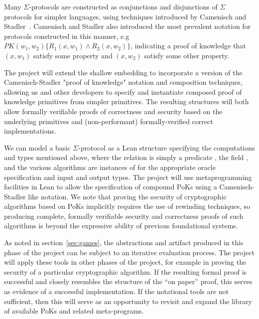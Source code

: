 Many $\Sigma$-protocols are constructed as conjunctions and disjunctions of $\Sigma$ protocols for simpler languages, using techniques introduced by Camenisch and Stadler~\cite{camenisch1997proof}.  
Camenisch and Stadler also introduced the most prevalent notation for protocols constructed in this manner, e.g $PK(w_1,w_2)\{ R_1(x,w_1) \land R_2(x,w_2)\}$, indicating a proof of knowledge that $(x,w_1)$ satisfy some property and $(x,w_2)$ satisfy some other property.

The project will extend the \vcvio shallow embedding to incorporate a version of the Camenisch-Stadler "proof of knowledge" notation and composition techniques, allowing us and other developers to specify and instantiate composed proof of knowledge primitives from simpler primitives.  The resulting structures will both allow formally verifiable proofs of correctness and security based on the underlying primitives and (non-performant) formally-verified correct implementations.  

We can model a basic $\Sigma$-protocol as a Lean structure specifying the computations and types mentioned above, where the relation  is simply a predicate , the field , and the various algorithms are instances of  for the appropriate oracle specification and input and output types.  
The project will use metaprogramming facilities in Lean to allow the specification of compound PoKs using a Camenisch-Stadler like notation.
We note that proving the security of cryptographic algorithms based on PoKs implicitly requires the use of rewinding techniques, so producing complete, formally verifiable security and correctness proofs of such algorithms is beyond the expressive ability of previous foundational systems.

As noted in section~\ref{sec:games}, the abstractions and artifact produced in this phase of the project can be subject to an iterative evaluation process.  The project will apply these tools in other phases of the project, for example in proving the security of a particular cryptographic algorithm.  If the resulting formal proof is successful and closely resembles the structure of the ``on paper'' proof, this serves as evidence of a successful implementation.  If the notational tools are not sufficient, then this will serve as an opportunity to revisit and expand the library of available PoKs and related meta-programs.

